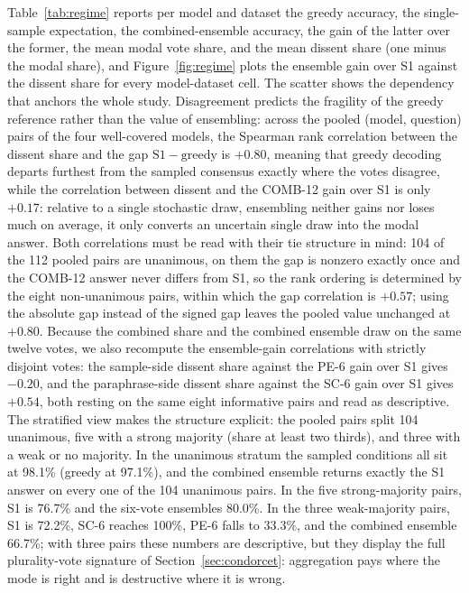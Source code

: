 Table~\ref{tab:regime} reports per model and dataset the greedy accuracy, the single-sample expectation, the combined-ensemble accuracy, the gain of the latter over the former, the mean modal vote share, and the mean dissent share (one minus the modal share), and Figure~\ref{fig:regime} plots the ensemble gain over S1 against the dissent share for every model-dataset cell. The scatter shows the dependency that anchors the whole study. Disagreement predicts the fragility of the greedy reference rather than the value of ensembling: across the pooled (model, question) pairs of the four well-covered models, the Spearman rank correlation between the dissent share and the gap $\mathrm{S1} - \mathrm{greedy}$ is $+0.80$, meaning that greedy decoding departs furthest from the sampled consensus exactly where the votes disagree, while the correlation between dissent and the COMB-12 gain over S1 is only $+0.17$: relative to a single stochastic draw, ensembling neither gains nor loses much on average, it only converts an uncertain single draw into the modal answer. Both correlations must be read with their tie structure in mind: 104 of the 112 pooled pairs are unanimous, on them the gap is nonzero exactly once and the COMB-12 answer never differs from S1, so the rank ordering is determined by the eight non-unanimous pairs, within which the gap correlation is $+0.57$; using the absolute gap instead of the signed gap leaves the pooled value unchanged at $+0.80$. Because the combined share and the combined ensemble draw on the same twelve votes, we also recompute the ensemble-gain correlations with strictly disjoint votes: the sample-side dissent share against the PE-6 gain over S1 gives $-0.20$, and the paraphrase-side dissent share against the SC-6 gain over S1 gives $+0.54$, both resting on the same eight informative pairs and read as descriptive. The stratified view makes the structure explicit: the pooled pairs split 104 unanimous, five with a strong majority (share at least two thirds), and three with a weak or no majority. In the unanimous stratum the sampled conditions all sit at 98.1\% (greedy at 97.1\%), and the combined ensemble returns exactly the S1 answer on every one of the 104 unanimous pairs. In the five strong-majority pairs, S1 is 76.7\% and the six-vote ensembles 80.0\%. In the three weak-majority pairs, S1 is 72.2\%, SC-6 reaches 100\%, PE-6 falls to 33.3\%, and the combined ensemble 66.7\%; with three pairs these numbers are descriptive, but they display the full plurality-vote signature of Section~\ref{sec:condorcet}: aggregation pays where the mode is right and is destructive where it is wrong.

